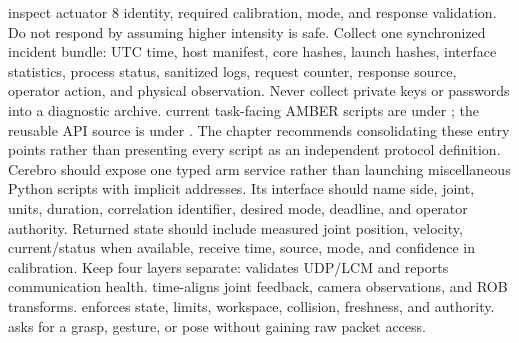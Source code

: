 \markdownRendererUlItem {} inspect actuator 8 identity, required calibration, mode, and response validation. Do not respond by assuming higher intensity is safe.\markdownRendererUlItemEnd 
\markdownRendererUlEnd \markdownRendererInterblockSeparator
{}Collect one synchronized incident bundle: UTC time, host manifest, core hashes, launch hashes, interface statistics, process status, sanitized logs, request counter, response source, operator action, and physical observation. Never collect private keys or passwords into a diagnostic archive.\markdownRendererInterblockSeparator
{}
\markdownRendererSectionEnd \markdownRendererSectionBegin
{}\markdownRendererInterblockSeparator
{}\markdownRendererBlockQuoteBegin
{} current task-facing AMBER scripts are under ; the reusable API source is under . The chapter recommends consolidating these entry points rather than presenting every script as an independent protocol definition.\markdownRendererBlockQuoteEnd \markdownRendererInterblockSeparator
{}Cerebro should expose one typed arm service rather than launching miscellaneous Python scripts with implicit addresses. Its interface should name side, joint, units, duration, correlation identifier, desired mode, deadline, and operator authority. Returned state should include measured joint position, velocity, current/status when available, receive time, source, mode, and confidence in calibration.\markdownRendererParagraphSeparator
{}Keep four layers separate:\markdownRendererInterblockSeparator
{}\markdownRendererOlBegin
{} validates UDP/LCM and reports communication health.\markdownRendererOlItemEnd 
{} time-aligns joint feedback, camera observations, and ROB transforms.\markdownRendererOlItemEnd 
{} enforces state, limits, workspace, collision, freshness, and authority.\markdownRendererOlItemEnd 
{} asks for a grasp, gesture, or pose without gaining raw packet access.\markdownRendererOlItemEnd 
\markdownRendererOlEnd \markdownRendererInterblockSeparator
